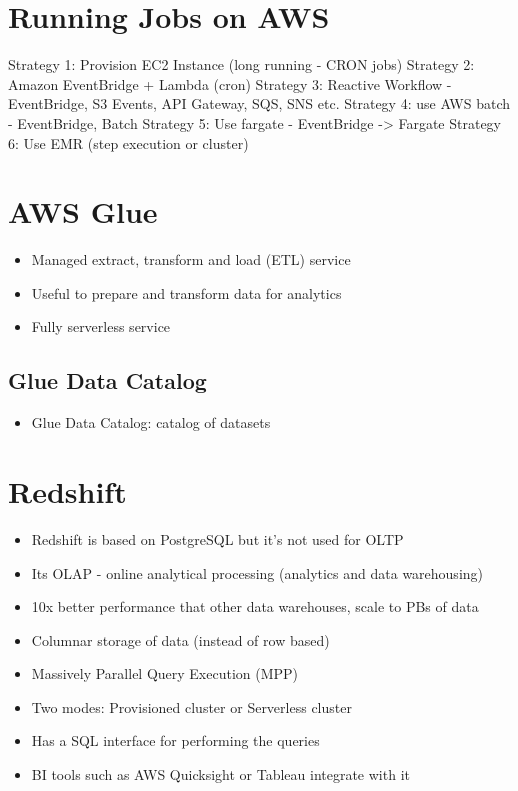 \section{Running Jobs on AWS}
Strategy 1: Provision EC2 Instance (long running - CRON jobs)
Strategy 2: Amazon EventBridge + Lambda (cron)
Strategy 3: Reactive Workflow - EventBridge, S3 Events, API Gateway, SQS, SNS etc.
Strategy 4: use AWS batch - EventBridge, Batch
Strategy 5: Use fargate - EventBridge -> Fargate
Strategy 6: Use EMR (step execution or cluster)


\section{AWS Glue}
\begin{itemize}
    \item Managed extract, transform and load (ETL) service
    \item Useful to prepare and transform data for analytics
    \item Fully serverless service
\end{itemize}

\subsection{Glue Data Catalog}
\begin{itemize}
    \item  Glue Data Catalog: catalog of datasets
\end{itemize}


\section{Redshift}
\begin{itemize}
    \item Redshift is based on PostgreSQL but it's not used for OLTP
    \item Its OLAP - online analytical processing (analytics and data warehousing)
    \item 10x better performance that other data warehouses, scale to PBs of data
    \item Columnar storage of data (instead of row based)
    \item Massively Parallel Query Execution (MPP)
    \item Two modes: Provisioned cluster or Serverless cluster
    \item Has a SQL interface for performing the queries
    \item BI tools such as AWS Quicksight or Tableau integrate with it
\end{itemize}

